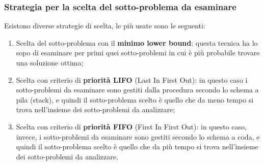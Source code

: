 \subsubsection*{Strategia per la scelta del sotto-problema da esaminare}
Esistono diverse strategie di scelta, le più usate sono le seguenti:
\begin{enumerate}
\item Scelta del sotto-problema con il \textbf{minimo lower bound}: questa tecnica ha lo sopo di esaminare per primi quei sotto-problemi in cui è più probabile trovare una soluzione ottima;
\item Scelta con criterio di \textbf{priorità LIFO} (Last In First Out): in questo caso i sotto-problemi da esaminare sono gestiti dalla procedura secondo lo schema a pila (stack), e quindi il sotto-problema scelto è quello che da meno tempo si trova nell'insieme dei sotto-problemi da analizzare;
\item Scelta con criterio di \textbf{priorità FIFO} (First In First Out): in questo caso, invece, i sotto-problemi da esaminare sono gestiti secondo lo schema a coda, e quindi il sotto-problema scelto è quello che da più tempo si trova nell'insieme dei sotto-problemi da analizzare.
\end{enumerate}